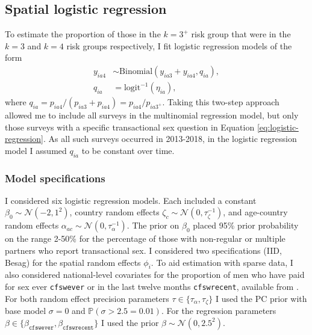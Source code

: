 \documentclass[a4paper, nobind]{templates/ociamthesis}
\begin{document}
\hypertarget{s-logistic}{%
\subsection{Spatial logistic regression}\label{s-logistic}}

To estimate the proportion of those in the \(k = 3^{+}\) risk group that were in the \(k = 3\) and \(k = 4\) risk groups respectively, I fit logistic regression models of the form
\begin{align}
    y_{ia4} &\sim \text{Binomial} \left( y_{ia3} + y_{ia4}, q_{ia} \right), \label{eq:logistic-regression} \\
    q_{ia} &= \text{logit}^{-1} \left( \eta_{ia} \right), 
\end{align}
where \(q_{ia} = p_{ia4} / (p_{ia3} + p_{ia4}) = p_{ia4} / p_{ia{3^+}}\).
Taking this two-step approach allowed me to include all surveys in the multinomial regression model, but only those surveys with a specific transactional sex question in Equation \ref{eq:logistic-regression}.
As all such surveys occurred in 2013-2018, in the logistic regression model I assumed \(q_{ia}\) to be constant over time.

\hypertarget{model-specifications-1}{%
\subsubsection{Model specifications}\label{model-specifications-1}}

I considered six logistic regression models.
Each included a constant \(\beta_0 \sim \mathcal{N}(-2, 1^2)\), country random effects \(\zeta_{c} \sim \mathcal{N}(0, \tau_\zeta^{-1})\), and age-country random effects \(\alpha_{ac} \sim \mathcal{N}(0, \tau_\alpha^{-1})\).
The prior on \(\beta_0\) placed 95\% prior probability on the range 2-50\% for the percentage of those with non-regular or multiple partners who report transactional sex.
I considered two specifications (IID, Besag) for the spatial random effects \(\phi_i\).
To aid estimation with sparse data, I also considered national-level covariates for the proportion of men who have paid for sex ever \texttt{cfswever} or in the last twelve months \texttt{cfswrecent}, available from \textcite{hodgins2022population}.
For both random effect precision parameters \(\tau \in \{\tau_\alpha, \tau_\zeta\}\) I used the PC prior with base model \(\sigma = 0\) and \(\mathbb{P}(\sigma > 2.5 = 0.01)\).
For the regression parameters \(\beta \in \{\beta_\texttt{cfswever}, \beta_\texttt{cfswrecent}\}\) I used the prior \(\beta \sim \mathcal{N}(0, 2.5^2)\).
\end{document}
